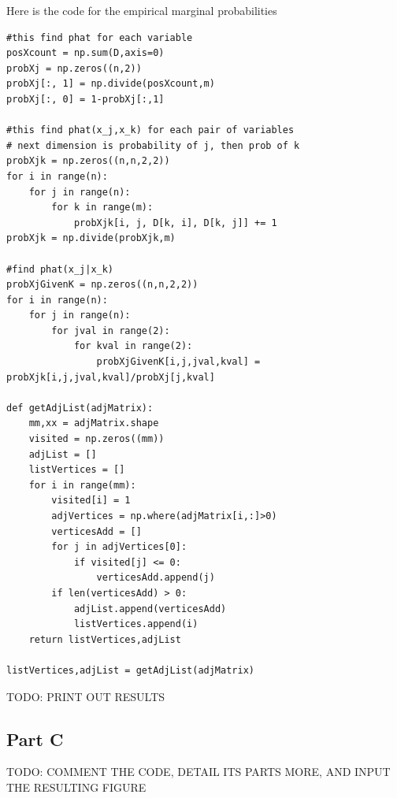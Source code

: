\documentclass[twoside,11pt]{article}
\theoremstyle{definition}
\begin{document}
Here is the code for the empirical marginal probabilities
\begin{lstlisting}
#this find phat for each variable
posXcount = np.sum(D,axis=0)
probXj = np.zeros((n,2))
probXj[:, 1] = np.divide(posXcount,m)
probXj[:, 0] = 1-probXj[:,1]

#this find phat(x_j,x_k) for each pair of variables
# next dimension is probability of j, then prob of k
probXjk = np.zeros((n,n,2,2))
for i in range(n):
    for j in range(n):
        for k in range(m):
            probXjk[i, j, D[k, i], D[k, j]] += 1
probXjk = np.divide(probXjk,m)

#find phat(x_j|x_k)
probXjGivenK = np.zeros((n,n,2,2))
for i in range(n):
    for j in range(n):
        for jval in range(2):
            for kval in range(2):
                probXjGivenK[i,j,jval,kval] = probXjk[i,j,jval,kval]/probXj[j,kval]

def getAdjList(adjMatrix):
    mm,xx = adjMatrix.shape
    visited = np.zeros((mm))
    adjList = []
    listVertices = []
    for i in range(mm):
        visited[i] = 1
        adjVertices = np.where(adjMatrix[i,:]>0)
        verticesAdd = []
        for j in adjVertices[0]:
            if visited[j] <= 0:
                verticesAdd.append(j)
        if len(verticesAdd) > 0:
            adjList.append(verticesAdd)
            listVertices.append(i)
    return listVertices,adjList

listVertices,adjList = getAdjList(adjMatrix)

\end{lstlisting}

TODO: PRINT OUT RESULTS

\subsection*{Part C}

TODO: COMMENT THE CODE, DETAIL ITS PARTS MORE, AND INPUT THE RESULTING FIGURE
\end{document}
